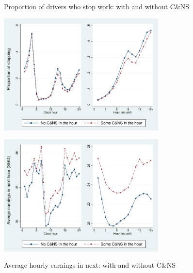 \documentclass[reviewmode,AEJ]{AEA}
\begin{document}
\begin{figure}
	{\centering
		\caption{Proportion of drivers who stop work: with and without C\&NS} %
		\includegraphics[width=0.75\textwidth]{./fg/modelfree_quit_vert.pdf}
		\label{fg:quitbyhour}
	}

	{\centering
		\caption{Average hourly earnings in next: with and without C\&NS} %
		\includegraphics[width=0.75\textwidth]{./fg/modelfree_earnings_vert.pdf}

		\label{fg:earningsbyhour}
	}
\end{figure}
\end{document}
